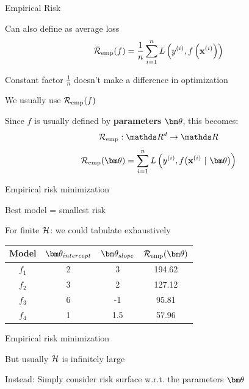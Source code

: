 \documentclass[11pt,compress,t,notes=noshow, xcolor=table]{beamer}
\begin{document}
\begin{framei}{Empirical Risk}
\item Can also define as average loss
$$
\bar{\mathcal{R}}_{\text{emp}}(f) = \frac{1}{n}\sum\limits_{i=1}^n L\left(y^{(i)}, f\left(\mathbf{x}^{(i)}\right)\right)
$$
\item Constant factor $\frac{1}{n}$ doesn't make a difference in optimization
\item We usually use $\mathcal{R}_{\text{emp}}(f)$ 
\item Since $f$ is usually defined by \textbf{parameters} $\thetav$, this becomes:
$$
\riske : \R^d \to \R
$$
$$
\risket = \sumin \Lxyit
$$
\end{framei}


\begin{framei}{Empirical risk minimization}
\item Best model = smallest risk
\item For finite $\mathcal{H}$: we could tabulate exhaustively
\vfill
\begin{center}
\begin{tabular}{ c | c | c || c } %
Model & \(\displaystyle \thetav_{intercept} \) & \(\displaystyle \thetav_{slope} \) & \(\displaystyle \risket \) \\ 
\hline
\(\displaystyle f_1 \)   & 2 & 3 & 194.62 \\
\(\displaystyle f_2 \)   & 3 & 2 & 127.12 \\  
\(\displaystyle f_3 \)   & 6 & -1 & 95.81 \\
\rowcolor{lightgray}
\(\displaystyle f_4 \)   & 1 & 1.5 & 57.96 \\  
\end{tabular}
\end{center}
\end{framei}


\begin{framei}{Empirical risk minimization}
\item But usually $\mathcal{H}$ is infinitely large
\item Instead: Simply consider risk surface w.r.t. the parameters $\thetav$ 
\end{framei}
\end{document}

